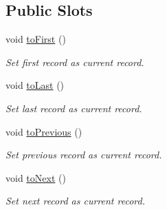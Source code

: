 \subsection*{Public Slots}
\begin{DoxyCompactItemize}
\item 
\hypertarget{classmdt_sql_form_widget_a4bb7ddf419e845de2d1a7c1ef95e48a8}{
void \hyperlink{classmdt_sql_form_widget_a4bb7ddf419e845de2d1a7c1ef95e48a8}{toFirst} ()}
\label{classmdt_sql_form_widget_a4bb7ddf419e845de2d1a7c1ef95e48a8}

\begin{DoxyCompactList}\small\item\em Set first record as current record. \end{DoxyCompactList}\item 
\hypertarget{classmdt_sql_form_widget_aefbaa029ac6141ab3d12da2a27d30dda}{
void \hyperlink{classmdt_sql_form_widget_aefbaa029ac6141ab3d12da2a27d30dda}{toLast} ()}
\label{classmdt_sql_form_widget_aefbaa029ac6141ab3d12da2a27d30dda}

\begin{DoxyCompactList}\small\item\em Set last record as current record. \end{DoxyCompactList}\item 
\hypertarget{classmdt_sql_form_widget_a7dc4bc0b63b10d420f7ab04a43e4f371}{
void \hyperlink{classmdt_sql_form_widget_a7dc4bc0b63b10d420f7ab04a43e4f371}{toPrevious} ()}
\label{classmdt_sql_form_widget_a7dc4bc0b63b10d420f7ab04a43e4f371}

\begin{DoxyCompactList}\small\item\em Set previous record as current record. \end{DoxyCompactList}\item 
\hypertarget{classmdt_sql_form_widget_a49496a848e015ed8335a2bfd33906000}{
void \hyperlink{classmdt_sql_form_widget_a49496a848e015ed8335a2bfd33906000}{toNext} ()}
\label{classmdt_sql_form_widget_a49496a848e015ed8335a2bfd33906000}

\begin{DoxyCompactList}\small\item\em Set next record as current record. \end{DoxyCompactList}\end{DoxyCompactItemize}
